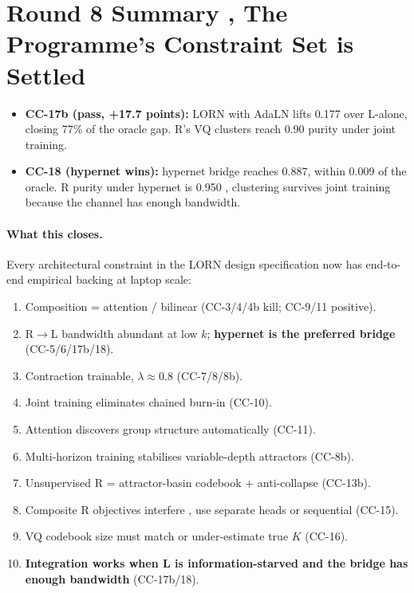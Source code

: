 \documentclass[10pt, twocolumn, a4paper]{article}
\begin{document}
\section{Round 8 Summary ,  The Programme's Constraint Set is Settled}

\begin{itemize}[nosep]
\item \textbf{CC-17b (pass, +17.7 points):} LORN with AdaLN lifts 0.177 over L-alone, closing 77\% of the oracle gap. R's VQ clusters reach 0.90 purity under joint training.
\item \textbf{CC-18 (hypernet wins):} hypernet bridge reaches 0.887, within 0.009 of the oracle. R purity under hypernet is 0.950 ,  clustering survives joint training because the channel has enough bandwidth.
\end{itemize}

\paragraph{What this closes.}

Every architectural constraint in the LORN design specification now has end-to-end empirical backing at laptop scale:

\begin{enumerate}[nosep,leftmargin=*]
\item Composition = attention / bilinear (CC-3/4/4b kill; CC-9/11 positive).
\item R$\to$L bandwidth abundant at low $k$; \textbf{hypernet is the preferred bridge} (CC-5/6/17b/18).
\item Contraction trainable, $\lambda \approx 0.8$ (CC-7/8/8b).
\item Joint training eliminates chained burn-in (CC-10).
\item Attention discovers group structure automatically (CC-11).
\item Multi-horizon training stabilises variable-depth attractors (CC-8b).
\item Unsupervised R = attractor-basin codebook + anti-collapse (CC-13b).
\item Composite R objectives interfere ,  use separate heads or sequential (CC-15).
\item VQ codebook size must match or under-estimate true $K$ (CC-16).
\item \textbf{Integration works when L is information-starved and the bridge has enough bandwidth} (CC-17b/18).
\end{enumerate}
\end{document}
